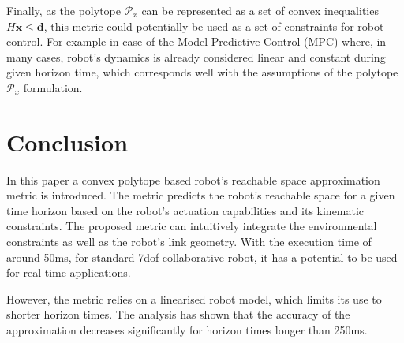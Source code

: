 Finally, as the polytope $\mathcal{P}_x$ can be represented as a set of convex inequalities $H\bm{x}\leq\bm{d}$, this metric could potentially be used as a set of constraints for robot control. For example in case of the Model Predictive Control (MPC) where, in many cases, robot's dynamics is already considered linear and constant during given horizon time, which corresponds well with the assumptions of the polytope $\mathcal{P}_x$ formulation. 





\section{Conclusion}
In this paper a convex polytope based robot's reachable space approximation metric is introduced. The metric predicts the robot's reachable space for a given time horizon based on the robot's actuation capabilities and its kinematic constraints. The proposed metric can intuitively integrate the environmental constraints as well as the robot's link geometry. With the execution time of around 50ms, for standard 7dof collaborative robot, it has a potential to be used for real-time applications. 

However, the metric relies on a linearised robot model, which limits its use to shorter horizon times. The analysis has shown that the accuracy of the approximation decreases significantly for horizon times longer than 250ms. 